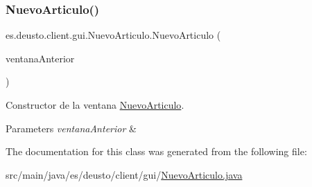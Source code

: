 \subsubsection{\texorpdfstring{NuevoArticulo()}{NuevoArticulo()}}
{\footnotesize\ttfamily es.\+deusto.\+client.\+gui.\+Nuevo\+Articulo.\+Nuevo\+Articulo (\begin{DoxyParamCaption}\item[{J\+Frame}]{ventana\+Anterior }\end{DoxyParamCaption})}

Constructor de la ventana \mbox{\hyperlink{classes_1_1deusto_1_1client_1_1gui_1_1_nuevo_articulo}{Nuevo\+Articulo}}. 
\begin{DoxyParams}{Parameters}
{\em ventana\+Anterior} & \\
\hline
\end{DoxyParams}


The documentation for this class was generated from the following file\+:\begin{DoxyCompactItemize}
\item 
src/main/java/es/deusto/client/gui/\mbox{\hyperlink{_nuevo_articulo_8java}{Nuevo\+Articulo.\+java}}\end{DoxyCompactItemize}
